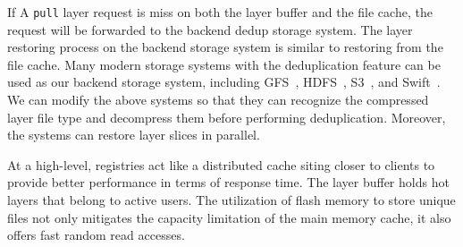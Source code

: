 If A \texttt{pull} layer request is miss on both the layer buffer and the file cache, 
the request will be forwarded to the backend dedup storage system.
The layer restoring process on the backend storage system is similar to restoring from the file cache.
Many modern storage systems with the deduplication feature can be used as our backend storage system, including GFS~\cite{gfs}, HDFS~\cite{hdfs}, S3~\cite{s3}, and Swift~\cite{swift}.
We can modify the above systems so that they can recognize the compressed layer file type and decompress them before performing deduplication.
Moreover, the systems can restore layer slices in parallel. 

At a high-level, registries act like a distributed cache siting closer to clients to provide better performance in terms of response time. 
The layer buffer holds hot layers that belong to active users.
The utilization of flash memory to store unique files not only mitigates the capacity limitation of the main memory cache, it also offers fast random read accesses.
